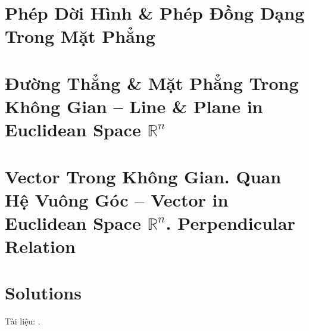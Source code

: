 \documentclass{article}
\numberwithin{equation}{section}
\begin{document}

\section{Phép Dời Hình \& Phép Đồng Dạng Trong Mặt Phẳng}


\section{Đường Thẳng \& Mặt Phẳng Trong Không Gian -- Line \& Plane in Euclidean Space $\mathbb{R}^n$}


\section{Vector Trong Không Gian. Quan Hệ Vuông Góc -- Vector in Euclidean Space $\mathbb{R}^n$. Perpendicular Relation}


\section{Solutions}


Tài liệu: \cite{SGK_Toan_11_dai_so_giai_tich_co_ban, SGK_Toan_11_dai_so_giai_tich_nang_cao, SGK_Toan_11_hinh_hoc_co_ban, SGK_Toan_11_hinh_hoc_nang_cao, TL_chuyen_Toan_Dai_So_Giai_Tich_11, TL_chuyen_Toan_Hinh_Hoc_11}.

\printbibliography[heading=bibintoc]
	
\end{document}
